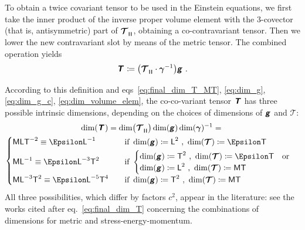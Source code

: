 \documentclass[\ifafour a4paper,12pt,\else a5paper,10pt,\fi%
onecolumn,oneside,article,%
british%
]{memoir}
\makeatletter
\theoremstyle{remark}
\theoremstyle{innote}
\newcommand*{\mathte}[1]{\textbf{\textit{\textsf{#1}}}}
\newcommand*{\defd}{\coloneqq}
\DeclarePairedDelimiter\abs{\lvert}{\rvert}
\renewcommand*{\|}[1][]{\nonscript\,#1\vert\nonscript\;\mathopen{}}
\newcommand*{\eqn}{eq.}%
\newcommand*{\eqns}{eqs}%
\newcommand*{\q}{}%
\DeclareRobustCommand*{\q}{%
  \mathord{\mathpalette\bigcdot@{}}%
}
\newcommand*{\bigcdot@scalefactor}{0.7}
\newcommand*{\bigcdot@widthfactor}{1.5}
\newcommand*{\bigcdot@}[2]{%
  \sbox0{$#1\vcenter{}$}%
  \sbox2{$#1\cdot\m@th$}%
  \hbox to \bigcdot@widthfactor\wd2{%
    \hfil
    \raise\ht0\hbox{%
      \scalebox{\bigcdot@scalefactor}{%
        \lower\ht0\hbox{$#1\bullet\m@th$}%
      }%
    }%
    \hfil
  }%
}
\newcommand*{\Le}{\textsf{L}}
\newcommand*{\Ti}{\textsf{T}}
\newcommand*{\Ma}{\textsf{M}}
\newcommand*{\En}{\Epsilon}%
\newcommand*{\ii}{\cdot}
\newcommand*{\rii}{\ii}
\newcommand*{\yg}{\mathte{g}}
\newcommand*{\yT}{\bm{\mathcal{T}}}
\newcommand*{\yTc}{\Hat{\mathte{T}}}
\newcommand*{\yTe}{\mathte{T}}
\renewcommand*{\i}{\indices}
\newcommand*{\ygv}{\bm{\gamma}}
\newcommand*{\rul}{{\mkern2mu\rule[-0.1ex]{0.75pt}{1.1ex}\mkern2mu}}
\DeclarePairedDelimiter\mul{\rul}{\rul}%
\makeatother
\begin{document}
To obtain a twice covariant tensor to be used in the Einstein equations, we
first take the inner product of the inverse proper volume element with the
3-covector (that is, antisymmetric) part of $\yT\i{_{\q \mul{\q\q\q}}}$,
obtaining a co-contravariant tensor. %
Then we lower the new contravariant slot by means of the metric tensor. The
combined operation yields
\begin{gather}
  \label{eq:co_co_T}
  \yTe\i{_{\q\q}} \defd
  \bigl(\yT\i{_{\q\mul{\q\q\q}}} \rii \ygv^{-1} \bigr) \yg \ .
\end{gather}

According to this definition and \eqns~\eqref{eq:final_dim_T_MT},
\eqref{eq:dim_g}, \eqref{eq:dim_g_c}, \eqref{eq:dim_volume_elem}, the
co-co-variant tensor $\yTe$ has three possible intrinsic dimensions,
depending on the choices of dimensions of $\yg$ and $\yT$:
\begin{multline}
\label{eq:dim_co_co_T}
\dim(\yTe\i{_{\q\q}}) =
\dim\bigl(\yT\i{_{\q \mul{\q\q\q}}}\bigr) \dim(\yg) \dim(\ygv)^{-1}
  ={}\\
  \begin{cases}
    \Ma\Le\Ti^{-2} \equiv \En\Le^{-1} & \quad\text{if}\ 
\dim(\yg)\defd \Le^2 \ ,\ \dim(\yT)\defd \En\Ti
    \\[\jot]
\Ma\Le^{-1} \equiv \En\Le^{-3}\Ti^{2} & \quad\text{if}\ 
 \begin{cases}
\dim(\yg)\defd \Ti^2 \ ,\ \dim(\yT)\defd \En\Ti 
    \quad\text{or}\\
\dim(\yg)\defd \Le^2 \ ,\ \dim(\yT)\defd \Ma\Ti 
 \end{cases}
   \\[2\jot]
    \Ma\Le^{-3}\Ti^{2} \equiv \En\Le^{-5}\Ti^{4} & \quad\text{if}\ 
\dim(\yg)\defd \Ti^2 \ ,\ \dim(\yT)\defd \Ma\Ti
  \end{cases}
\end{multline}
All three possibilities, which differ by factors $c^{2}$, appear in the
literature: see the works cited after \eqn~\eqref{eq:final_dim_T}
concerning the combinations of dimensions for metric and
stress-energy-momentum.
\end{document}
